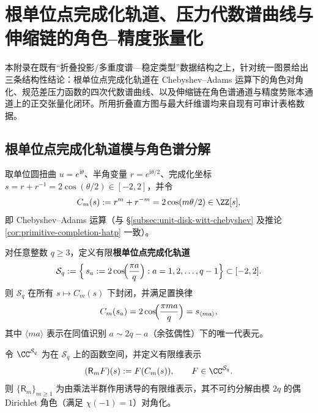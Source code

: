
\section{根单位点完成化轨道、压力代数谱曲线与伸缩链的角色--精度张量化}\label{app:root-unit-character-pressure-tensor}

本附录在既有“折叠投影/多重度谱---稳定类型”数据结构之上，针对统一图景给出三条结构性结论：根单位点完成化轨道在 Chebyshev--Adams 运算下的角色对角化、规范差压力函数的四次代数谱曲线、以及伸缩链在角色谱通道与精度势账本通道上的正交张量化闭环。所用折叠直方图与最大纤维谱均来自现有可审计表格数据。

\subsection{根单位点完成化轨道模与角色谱分解}\label{subsec:root-unit-completion-orbit-character}

取单位圆扭曲 \(u=e^{\mathrm{i}\theta}\)、半角变量 \(r=e^{\mathrm{i}\theta/2}\)、完成化坐标
\(s=r+r^{-1}=2\cos(\theta/2)\in[-2,2]\)，并令
\begin{equation}\label{eq:chebyshev-adams-Cm}
C_m(s):=r^m+r^{-m}=2\cos(m\theta/2)\in\ZZ[s],
\end{equation}
即 Chebyshev--Adams 运算（与 \S\ref{subsec:unit-disk-witt-chebyshev} 及推论 \ref{cor:primitive-completion-hatp} 一致）。

对任意整数 \(q\ge 3\)，定义有限\textbf{根单位点完成化轨道}
\begin{equation}\label{eq:root-unit-orbit-Sq}
\mathcal{S}_q:=\Bigl\{\, s_a:=2\cos\!\Bigl(\frac{\pi a}{q}\Bigr) : a=1,2,\dots,q-1 \Bigr\}\subset[-2,2].
\end{equation}
则 \(\mathcal{S}_q\) 在所有 \(s\mapsto C_m(s)\) 下封闭，并满足置换律
\begin{equation}\label{eq:root-unit-Cm-permutation}
C_m(s_a)=2\cos\!\Bigl(\frac{\pi m a}{q}\Bigr)=s_{\langle ma\rangle},
\end{equation}
其中 \(\langle ma\rangle\) 表示在同值识别 \(a\sim 2q-a\)（余弦偶性）下的唯一代表元。

令 \(\CC^{\mathcal{S}_q}\) 为在 \(\mathcal{S}_q\) 上的函数空间，并定义有限维表示
\begin{equation}\label{eq:root-unit-Rm}
(\mathsf{R}_m F)(s):=F(C_m(s)),\qquad F\in\CC^{\mathcal{S}_q}.
\end{equation}
则 \(\{\mathsf{R}_m\}_{m\ge 1}\) 为由乘法半群作用诱导的有限维表示，其不可约分解由模 \(2q\) 的偶 Dirichlet 角色（满足 \(\chi(-1)=1\)）对角化。

